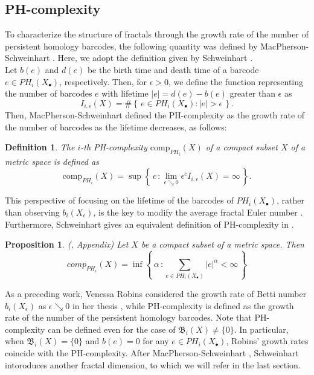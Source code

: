 \documentclass[12pt]{amsart}
\numberwithin{equation}{section}
\newtheorem{prop}[thm]{\bf Proposition}
\newtheorem{dfn}[thm]{\bf Definition}
\begin{document}
\subsection{PH-complexity}
To characterize the structure of fractals through the growth rate of the number of persistent homology barcodes, the following quantity was defined by MacPherson-Schweinhart \cite{MS12}. 
Here, we adopt the definition given by Schweinhart \cite{S21}.\\
\indent
Let $b(e)$ and $d(e)$ be the birth time and death time of a barcode $e\in PH_i(X_\bullet)$, respectively. 
Then, for $\epsilon > 0$, we define the function representing the number of barcodes $e$ with lifetime $|e| = d(e) - b(e)$ greater than $\epsilon$ as
\begin{equation*}
    I_{i,\epsilon}(X) = \# \left\{ \, e \in PH_i(X_\bullet) \colon |e| > \epsilon \, \right\}.
\end{equation*}
Then, MacPherson-Schweinhart\cite{MS12} defined the PH-complexity as the growth rate of the number of barcodes as the lifetime decreases, as follows:
\begin{dfn}
    The $i$-th PH-complexity $\mathrm{comp}_{PH_i}(X)$ of a compact subset $X$ of a metric space is defined as
    \begin{equation*}
        \mathrm{comp}_{PH_i} (X) = \sup \left\{\, c \, \colon \lim_{\epsilon \searrow 0} \epsilon^c I_{i,\epsilon} (X) = \infty \, \right\}.
    \end{equation*}
    \label{dfn:ph-complexity}
\end{dfn}
This perspective of focusing on the lifetime of the barcodes of $PH_i (X_\bullet)$, rather than observing $b_i (X_\epsilon)$, is the key to modify the average fractal Euler number \cite{LW07}. 
Furthermore, Schweinhart gives an equivalent definition of PH-complexity in \cite{S21}.
\begin{prop}
    \label{prp: equivalent definition of PH-complexity}
    (\cite{S21}, Appendix)
    Let $X$ be a compact subset of a metric space. Then
    \begin{equation*}
        comp_{PH_i} (X) = \inf \left\{ \, \alpha \, \colon \sum_{e\in PH_i (X_\bullet)} |e|^\alpha < \infty \, \right\}
    \end{equation*}
\end{prop}

As a preceding work, Venessa Robins considered the growth rate of Betti number $b_i(X_\epsilon)$ as $\epsilon \searrow 0$ in her thesis \cite{Robins}, while PH-complexity is defined as the growth rate of the number of the persistent homology barcodes. 
Note that PH-complexity can be defined even for the case of $\mathfrak{B}_i(X) \neq \{0\}$.
In particular, when $\mathfrak{B}_i(X)=\{0\}$ and $b(e)=0$ for any $e \in PH_i(X_\bullet)$, Robins' growth rates coincide with the PH-complexity. 
After MacPherson-Schweinhart \cite{MS12}, Schweinhart \cite{S21} intoroduces another fractal dimension, to which we will refer in the last section.
\end{document}
